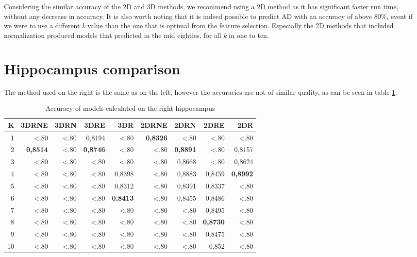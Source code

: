 Considering the similar accuracy of the 2D and 3D methods, we recommend using a 2D method as it has significant faster run time, without any decrease in accuracy. It is also worth noting that it is indeed possible to predict AD with an accuracy of above 80\%, event if we were to use a different \emph{k} value than the one that is optimal from the feature selection. Especially the 2D methods that included normalization produced models that predicted in the mid eighties, for all \emph{k} in one to ten.

\section{Hippocampus comparison}

The method used on the right is the same as on the left, however the accuracies are not of similar quality, as can be seen in table \ref{tab:RightModels}.
\begin{table}[H]
  \centering
    \begin{tabular}{|r|r|r|r|r|r|r|r|r|}
     \hline
    K     & 3DRNE & 3DRN  & 3DRE  & 3DR   & 2DRNE & 2DRN  & 2DRE  & 2DR \\  \hline
    1     & <.80  & <.80  & 0,8194 & <.80  & \textbf{0,8326} & <.80  & <.80  & <.80 \\  \hline
    2     & \textbf{0,8514} & <.80  & \textbf{0,8746} & <.80  & <.80  & \textbf{0,8891} & <.80  & 0,8157 \\ \hline
    3     & <.80  & <.80  & <.80  & <.80  & <.80  & 0,8668 & <.80  & 0,8624 \\ \hline
    4     & <.80  & <.80  & <.80  & 0,8398 & <.80  & 0,8883 & 0,8459 & \textbf{0,8992} \\ \hline
    5     & <.80  & <.80  & <.80  & 0,8312 & <.80  & 0,8391 & 0,8337 & <.80 \\ \hline
    6     & <.80  & <.80  & <.80  & \textbf{0,8413 }& <.80  & 0,8455 & 0,8486 & <.80 \\ \hline
    7     & <.80  & <.80  & <.80  & <.80  & <.80  & <.80  & 0,8495 & <.80 \\ \hline
    8     & <.80  & <.80  & <.80  & <.80  & <.80  & <.80  & \textbf{0,8730} & <.80 \\ \hline
    9     & <.80  & <.80  & <.80  & <.80  & <.80  & <.80  & 0,8475 & <.80 \\ \hline
    10    & <.80  & <.80  & <.80  & <.80  & <.80  & <.80  & 0,852 & <.80 \\ \hline
    \end{tabular}%
    \caption{Accuracy of models calculated on the right hippocampus}\label{tab:RightModels}%
\end{table}%
